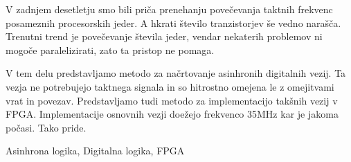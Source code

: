 \povzetek
V zadnjem desetletju smo bili priča prenehanju povečevanja taktnih frekvenc posameznih procesorskih jeder. A hkrati število tranzistorjev še vedno narašča. Trenutni trend je povečevanje števila jeder, vendar nekaterih problemov ni mogoče paralelizirati, zato ta pristop ne pomaga.

V tem delu predstavljamo metodo za načrtovanje asinhronih digitalnih vezij. Ta vezja ne potrebujejo taktnega signala in so hitrostno omejena le z omejitvami vrat in povezav. Predstavljamo tudi metodo za implementacijo takšnih vezij v FPGA. Implementacije osnovnih vezji doežejo frekvenco 35MHz kar je jakoma počasi. Tako pride.

\kljucnebesede
Asinhrona logika, Digitalna logika, FPGA
